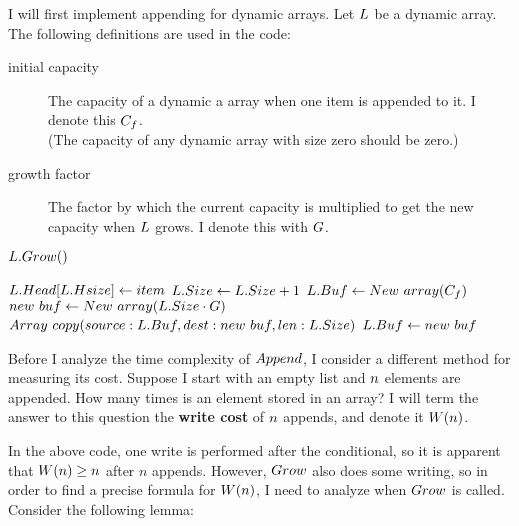 \dynarrayimpl

I will first implement appending for dynamic arrays. Let $L$ be a dynamic array. The following definitions are used in the code:

\begin{description}
	\item[initial capacity] The capacity of a dynamic a array when one item is appended to it. I denote this $C_f$.\\
	(The capacity of any dynamic array with size zero should be zero.)
	\item[growth factor] The factor by which the current capacity is multiplied to get the new capacity when $L$ grows. I denote this with $G$.
\end{description}

\begin{algorithm}
	\begin{algorithmic}[1]
				\State $L.Grow()$
			\EndIf
			
			\State $L.Head[L.Hsize] \gets item$
			\State $L.Size \gets L.Size + 1$
		\EndProcedure
		\Statex
				\State $L.Buf \gets New\ array(C_f)$
			\Else
				\State $new\ buf \gets New\ array(L.Size \cdot G)$
				\State $Array\ copy(source: L.Buf, dest: new\ buf, len: L.Size)$
				\State $L.Buf \gets new\ buf$
			\EndIf
		\EndProcedure
	\end{algorithmic}
\end{algorithm}

\HdrTimeComplex

Before I analyze the time complexity of $Append$, I consider a different method for measuring its cost. Suppose I start with an empty list and $n$ elements are appended. How many times is an element stored in an array? I will term the answer to this question the \textbf{write cost} of $n$ appends, and denote it $W(n)$.

In the above code, one write is performed after the conditional, so it is apparent that $W(n) \geq n$ after $n$ appends. However, $Grow$ also does some writing, so in order to find a precise formula for $W(n)$, I need to analyze when $Grow$ is called. Consider the following lemma:


